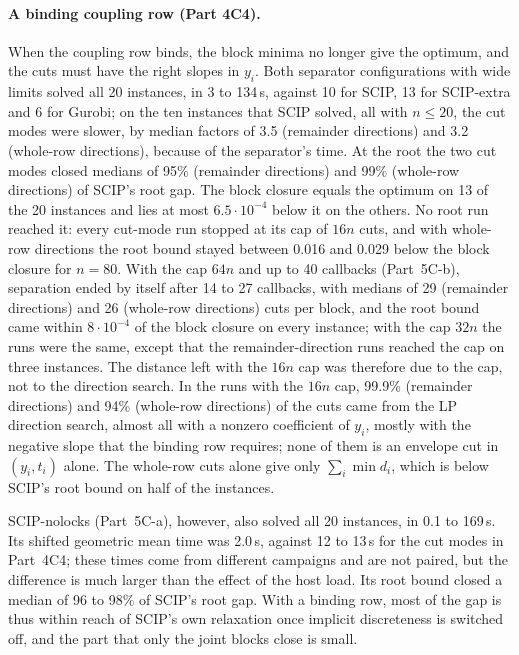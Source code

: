 \paragraph{A binding coupling row (Part 4C4).} When the coupling row binds,
the block minima no longer give the optimum, and the cuts must have the right
slopes in $y_i$. Both separator configurations with wide limits solved all 20
instances, in 3 to 134\,s, against 10 for SCIP, 13 for SCIP-extra and 6 for
Gurobi; on the ten instances that SCIP solved, all with $n\le20$, the cut modes
were slower, by median factors of 3.5 (remainder directions) and 3.2
(whole-row directions), because of the separator's time. At the root the two
cut modes closed medians of 95\% (remainder directions) and 99\% (whole-row
directions) of SCIP's root gap. The block closure equals the optimum on 13 of
the 20 instances and lies at most $6.5\cdot10^{-4}$ below it on the others. No
root run reached it: every cut-mode run stopped at its cap of $16n$ cuts, and
with whole-row directions the root bound stayed between 0.016 and 0.029 below
the block closure for $n=80$. With the cap $64n$ and up to 40 callbacks
(Part~5C-b), separation ended by itself after 14 to 27 callbacks, with medians
of 29 (remainder directions) and 26 (whole-row directions) cuts per block, and
the root bound came within $8\cdot10^{-4}$ of the block closure on every
instance; with the cap $32n$ the runs were the same, except that the
remainder-direction runs reached the cap on three instances. The distance left
with the $16n$ cap was therefore due to the cap, not to the direction search.
In the runs with the $16n$ cap, 99.9\% (remainder directions) and 94\%
(whole-row directions) of the cuts came from the LP direction search, almost
all with a nonzero coefficient of $y_i$, mostly with the negative slope that the
binding row requires; none of them is an envelope cut in $(y_i,t_i)$ alone. The
whole-row cuts alone give only $\sum_i\min d_i$, which is below SCIP's root bound
on half of the instances.

SCIP-nolocks (Part~5C-a), however, also solved all 20 instances, in 0.1 to
169\,s. Its shifted geometric mean time was 2.0\,s, against 12 to 13\,s for the
cut modes in Part~4C4; these times come from different campaigns and are not
paired, but the difference is much larger than the effect of the host load.
Its root bound closed a median of 96 to 98\% of SCIP's root gap. With a binding
row, most of the gap is thus within reach of SCIP's own relaxation once
implicit discreteness is switched off, and the part that only the joint blocks
close is small.

